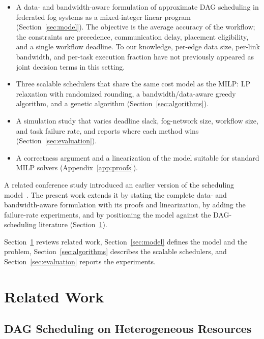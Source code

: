 \documentclass[conference]{IEEEtran}
\begin{document}
\begin{itemize}
    \item A data- and bandwidth-aware formulation of approximate DAG scheduling in federated fog systems as a mixed-integer linear program (Section~\ref{sec:model}). The objective is the average accuracy of the workflow; the constraints are precedence, communication delay, placement eligibility, and a single workflow deadline. To our knowledge, per-edge data size, per-link bandwidth, and per-task execution fraction have not previously appeared as joint decision terms in this setting.
    \item Three scalable schedulers that share the same cost model as the MILP: LP relaxation with randomized rounding, a bandwidth/data-aware greedy algorithm, and a genetic algorithm (Section~\ref{sec:algorithms}).
    \item A simulation study that varies deadline slack, fog-network size, workflow size, and task failure rate, and reports where each method wins (Section~\ref{sec:evaluation}).
    \item A correctness argument and a linearization of the model suitable for standard MILP solvers (Appendix~\ref{app:proofs}).
\end{itemize}

A related conference study introduced an earlier version of the scheduling model~\cite{gupta2025efficient}. The present work extends it by stating the complete data- and bandwidth-aware formulation with its proofs and linearization, by adding the failure-rate experiments, and by positioning the model against the DAG-scheduling literature (Section~\ref{sec:related}).

Section~\ref{sec:related} reviews related work, Section~\ref{sec:model} defines the model and the problem, Section~\ref{sec:algorithms} describes the scalable schedulers, and Section~\ref{sec:evaluation} reports the experiments.

\section{Related Work}
\label{sec:related}

\subsection{DAG Scheduling on Heterogeneous Resources}
\end{document}

